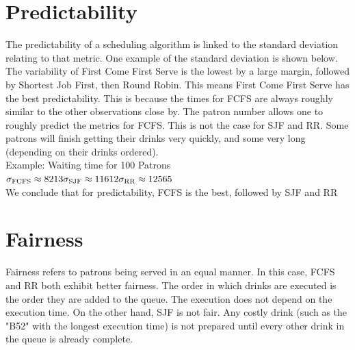 \documentclass{assignment}
\begin{document}
\section{Predictability}
The predictability of a scheduling algorithm is linked to the standard deviation relating to that metric. One example of the standard deviation is shown below. 
The variability of First Come First Serve is the lowest by a large margin, followed by Shortest Job First, then Round Robin. This means First Come First Serve has the best predictability. This is because the times for FCFS are always roughly similar to the other observations close by. The patron number allows one to roughly predict the metrics for FCFS. This is not the case for SJF and RR. Some patrons will finish getting their drinks very quickly, and some very long (depending on their drinks ordered). \\ Example: Waiting time for 100 Patrons \\ $\sigma_{\text{FCFS}} \approx 8213 \\ \sigma_{\text{SJF}} \approx 11612 \\ \sigma_{\text{RR}} \approx 12565$ \\ We conclude that for predictability, FCFS is the best, followed by SJF and RR

\section{Fairness}
Fairness refers to patrons being served in an equal manner. In this case, FCFS and RR both exhibit better fairness. The order in which drinks are executed is the order they are added to the queue. The execution does not depend on the execution time. On the other hand, SJF is not fair. Any costly drink (such as the "B52" with the longest execution time) is not prepared until every other drink in the queue is already complete.
\end{document}
